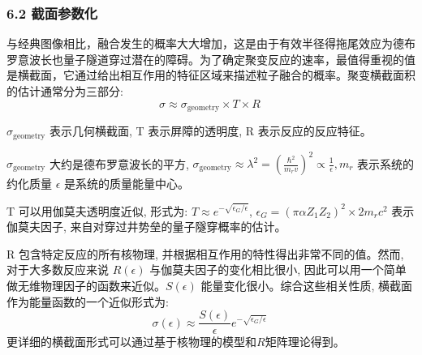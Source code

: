 \subsubsection{6.2 截面参数化}
与经典图像相比，融合发生的概率大大增加，这是由于有效半径得拖尾效应为德布罗意波长也量子隧道穿过潜在的障碍。为了确定聚变反应的速率，最值得重视的值是横截面，它通过给出相互作用的特征区域来描述粒子融合的概率。聚变横截面积的估计通常分为三部分:
$$\sigma \approx \sigma_{\text{geometry}} \times T \times R~$$

$\sigma_{\text{geometry}}$ 表示几何横截面, T 表示屏障的透明度, R 表示反应的反应特征。

$\sigma_{\text{geometry}}$ 大约是德布罗意波长的平方, 
$\sigma_{\text{geometry}} \approx \lambda^2 = \left( \frac{\hbar^2}{m_r v} \right)^2 \propto \frac{1}{\epsilon}, 
m_r$ 表示系统的约化质量 $\epsilon$ 是系统的质量能量中心。

T 可以用伽莫夫透明度近似, 形式为: $T \approx e^{-\sqrt{\epsilon_G / \epsilon}}$, 
$\epsilon_G = \left( \pi \alpha Z_1 Z_2 \right)^2 \times 2 m_r c^2$ 表示伽莫夫因子, 来自对穿过井势垒的量子隧穿概率的估计。

R 包含特定反应的所有核物理, 并根据相互作用的特性得出非常不同的值。然而, 对于大多数反应来说 $R(\epsilon)$ 与伽莫夫因子的变化相比很小, 因此可以用一个简单做无维物理因子的函数来近似。$S(\epsilon)$ 能量变化很小。综合这些相关性质, 横截面作为能量函数的一个近似形式为:
$$\sigma(\epsilon) \approx \frac{S(\epsilon)}{\epsilon} e^{-\sqrt{\epsilon_G / \epsilon}}~$$
更详细的横截面形式可以通过基于核物理的模型和$R$矩阵理论得到。
